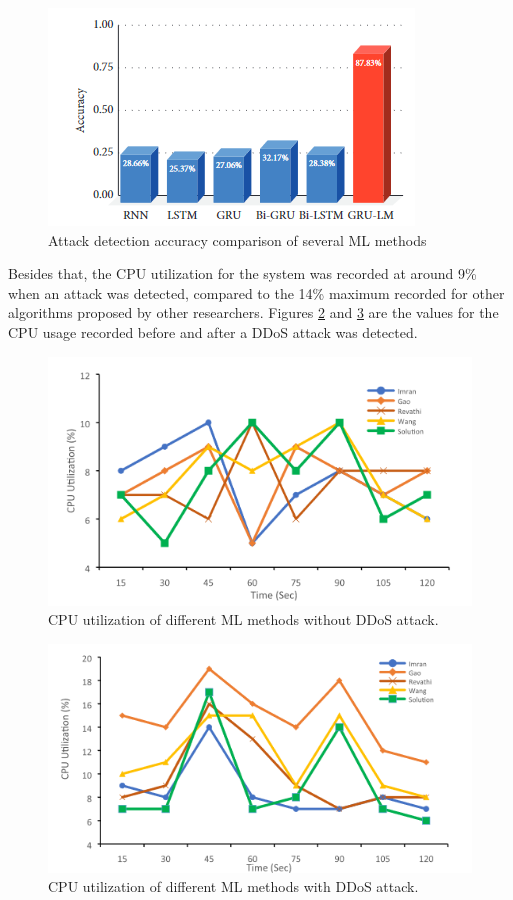 \documentclass[a4paper, 12pt]{article}
\begin{document}
\begin{figure}[H]
    \centering
    \includegraphics[width=0.7\linewidth]{image.png}
    \caption{Attack detection accuracy comparison of several ML methods \protect{}}
    \label{fig:4}
\end{figure}

Besides that, the CPU utilization for the system was recorded at around 9\% when an attack was detected, compared to the 14\% maximum recorded for other algorithms proposed by other researchers. Figures \ref{fig:cpu1} and \ref{fig:cpu2} are the values for the CPU usage recorded before and after a DDoS attack was detected.  

\begin{figure}[H]
    \centering
    \includegraphics[width=0.7\linewidth]{image-cpu1.png}
    \caption{CPU utilization of different ML methods without DDoS attack. \protect{}}
    \label{fig:cpu1}
\end{figure}

\begin{figure}[H]
    \centering
    \includegraphics[width=0.7\linewidth]{image-cpu2.png}
    \caption{CPU utilization of different ML methods with DDoS attack. \protect{}}
    \label{fig:cpu2}
\end{figure}
\end{document}
